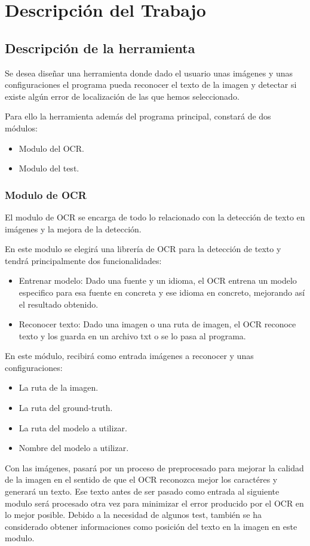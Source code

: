 \chapter{Descripción del Trabajo}
\label{cap:descripcionTrabajo}
\section{Descripción de la herramienta}
\label{sec:Descripción de la herramienta}
Se desea diseñar una herramienta donde dado el usuario unas imágenes y unas configuraciones el programa pueda reconocer el texto de la imagen y detectar si existe algún error de localización de las que hemos seleccionado.

Para ello la herramienta además del programa principal, constará de dos módulos:
\begin{itemize}
	\item Modulo del OCR.
	\item Modulo del test.
\end{itemize}
\subsection{Modulo de OCR}
El modulo de OCR se encarga de todo lo relacionado con la detección de texto en imágenes y la mejora de la detección.

En este modulo se elegirá una librería de OCR para la detección de texto y tendrá principalmente dos funcionalidades: 
\begin{itemize}
	\item Entrenar modelo: Dado una fuente y un idioma, el OCR entrena un modelo especifico para esa fuente en concreta y ese idioma en concreto, mejorando así el resultado obtenido.
	\item Reconocer texto: Dado una imagen o una ruta de imagen, el OCR reconoce texto y los guarda en un archivo txt o se lo pasa al programa.
\end{itemize}
En este módulo, recibirá como entrada imágenes a reconocer y unas configuraciones:
\begin{itemize}
	\item La ruta de la imagen.
	\item La ruta del ground-truth.
	\item La ruta del modelo a utilizar.
	\item Nombre del modelo a utilizar.
\end{itemize}
Con las imágenes, pasará por un proceso de preprocesado para mejorar la calidad de la imagen en el sentido de que el OCR reconozca mejor los caractéres y generará un texto.
Ese texto antes de ser pasado como entrada al siguiente modulo será procesado otra vez para minimizar el error producido por el OCR en lo mejor posible.
Debido a la necesidad de algunos test, también se ha considerado obtener informaciones como posición del texto en la imagen en este modulo.
